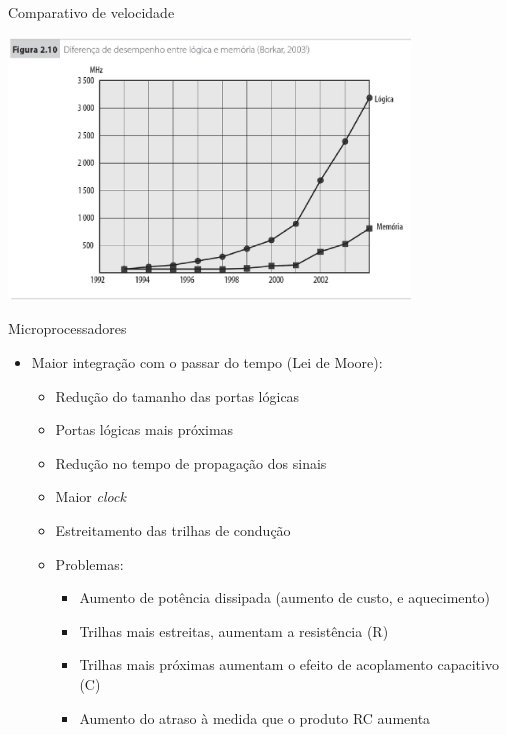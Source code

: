\begin{slide}[toc=]{Comparativo de velocidade}
	\begin{center}
		\includegraphics[width=0.80\textwidth]{figs/diff_proc_mem.eps} 
	\end{center}
\end{slide}

\begin{slide}[toc=]{Microprocessadores}
	\begin{itemize}
		\item Maior integração com o passar do tempo (Lei de Moore):\pause
			\begin{itemize}
				\item Redução do tamanho das portas lógicas
				\item Portas lógicas mais próximas
				\item Redução no tempo de propagação dos sinais
				\item Maior \textit{clock}
				\item Estreitamento das trilhas de condução\pause
				\item Problemas:
					\begin{itemize}
						\item Aumento de potência dissipada (aumento de custo, e aquecimento)\pause
						\item Trilhas mais estreitas, aumentam a resistência (R)\pause
						\item Trilhas mais próximas aumentam o efeito de acoplamento capacitivo (C)     \pause
						\item Aumento do atraso à medida que o produto RC aumenta
					\end{itemize}
			\end{itemize}
	\end{itemize}
\end{slide}

